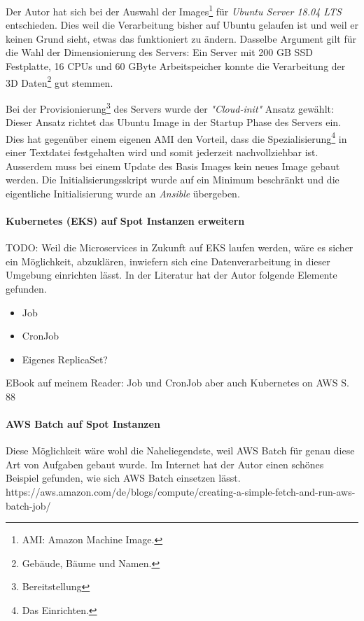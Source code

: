 Der Autor hat sich bei der Auswahl der Images\footnote{AMI: Amazon Machine Image.} für \emph{Ubuntu Server 18.04 LTS} entschieden. Dies weil die Verarbeitung bisher auf Ubuntu gelaufen ist und weil er keinen Grund sieht, etwas das funktioniert zu ändern. Dasselbe Argument gilt für die Wahl der Dimensionierung des Servers: Ein Server mit 200 GB SSD Festplatte, 16 CPUs und 60 GByte Arbeitspeicher konnte die Verarbeitung der 3D Daten\footnote{Gebäude, Bäume und Namen.} gut stemmen.

Bei der Provisionierung\footnote{Bereitstellung} des Servers wurde der \emph{"Cloud-init"} Ansatz gewählt: Dieser Ansatz richtet das Ubuntu Image in der Startup Phase des Servers ein. Dies hat gegenüber einem eigenen AMI den Vorteil, dass die Spezialisierung\footnote{Das Einrichten.} in einer Textdatei festgehalten wird und somit jederzeit nachvollziehbar ist. Ausserdem muss bei einem Update des Basis Images kein neues Image gebaut werden.
Die Initialisierungsskript wurde auf ein Minimum beschränkt und die eigentliche Initialisierung wurde an \emph{Ansible} übergeben. 

\paragraph{Kubernetes (EKS) auf Spot Instanzen erweitern}
TODO: Weil die Microservices in Zukunft auf EKS laufen werden, wäre es sicher ein Möglichkeit, abzuklären, inwiefern sich eine Datenverarbeitung in dieser Umgebung einrichten lässt. In der Literatur hat der Autor folgende Elemente gefunden.

\begin{itemize}
\item Job
\item CronJob
\item Eigenes ReplicaSet?
\end{itemize}

EBook auf meinem Reader: Job und CronJob aber auch Kubernetes on AWS S. 88

\paragraph{AWS Batch auf Spot Instanzen}
Diese Möglichkeit wäre wohl die Naheliegendste, weil AWS Batch für genau diese Art von Aufgaben gebaut wurde. Im Internet hat der Autor einen schönes Beispiel gefunden, wie sich AWS Batch einsetzen lässt.
https://aws.amazon.com/de/blogs/compute/creating-a-simple-fetch-and-run-aws-batch-job/
